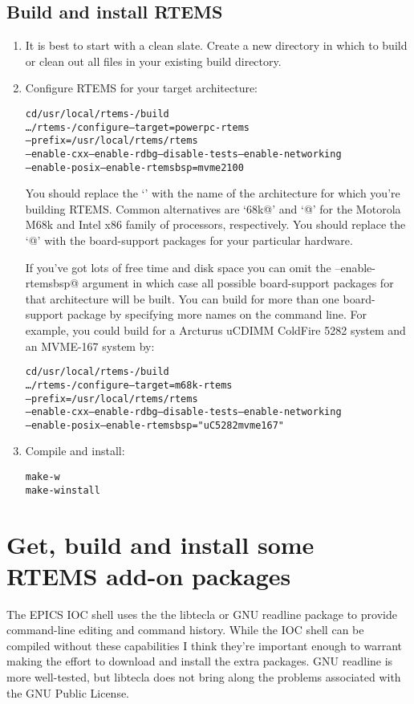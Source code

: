 \documentclass{report}
\begin{document}
\subsection{Build and install RTEMS}
\label{RTEMS_BSP_CONFIG}
\begin{enumerate}
\item
It is best to start with a clean slate.  Create a new directory in which to build or clean out all files in your existing build directory.

\item
Configure RTEMS for your target architecture:
\begin{alltt}
cd /usr/local/rtems-\rtemsVersion/build
\ldots/rtems-\rtemsVersion/configure --target=powerpc-rtems\rtemsVersion \verb@\@
  --prefix=/usr/local/rtems/rtems\rtemsVersion \verb@\@
  --enable-cxx --enable-rdbg --disable-tests --enable-networking \verb@\@
  --enable-posix --enable-rtemsbsp=mvme2100 \verb@\@
\end{alltt}
You should replace the `\verb@powerpc@' with the name of the architecture
for which you're building RTEMS.  Common alternatives
are `\verb@m68k@' and `@' for
the Motorola M68k and Intel x86 family of processors, respectively.
You should replace the `@' with the board-support packages
for your particular hardware.

If you've got lots of free time and disk space
you can omit the \verb@--enable-rtemsbsp@ argument in which case all
possible board-support packages for that architecture will be built.
You can build for more than one board-support package by specifying
more names on the command line.  For example,
you could build for a Arcturus uCDIMM ColdFire 5282 system and an MVME-167 system
by:
\begin{alltt}
cd /usr/local/rtems-\rtemsVersion/build
\ldots/rtems-\rtemsVersion/configure --target=m68k-rtems\rtemsVersion \verb@\@
      --prefix=/usr/local/rtems/rtems\rtemsVersion \verb@\@
      --enable-cxx --enable-rdbg --disable-tests --enable-networking \verb@\@
      --enable-posix --enable-rtemsbsp="uC5282 mvme167" \verb@\@
\end{alltt}

\item
Compile and install:
\begin{alltt}
make -w
make -w install
\end{alltt}
\end{enumerate}


\section{Get, build and install some RTEMS add-on packages}
The EPICS IOC shell uses the the libtecla or GNU readline package to provide command-line editing and command history.
While the IOC shell can be compiled without these capabilities I think they're important enough to warrant
making the effort to download and install the extra packages.
GNU readline is more well-tested, but libtecla does not bring along
the problems associated with the GNU Public License.
\end{document}
